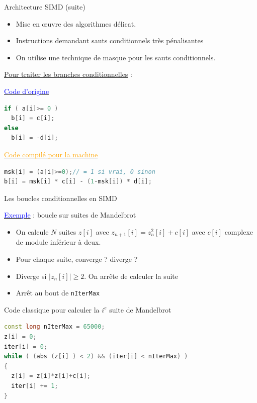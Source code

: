 \documentclass[handout]{beamer}
\begin{document}
\begin{frame}[fragile]{Architecture SIMD (suite)}

\begin{itemize}
\item Mise en {\oe}uvre des algorithmes délicat.
\item Instructions demandant sauts conditionnels très pénalisantes
\item On utilise une technique de masque pour les sauts conditionnels.
\end{itemize}

\underline{Pour traiter les branches conditionnelles} :

\begin{minipage}[t]{0.22\textwidth}
\underline{\textcolor{blue}{Code d'origine}}

 \begin{lstlisting}[language=C++]
if ( a[i]>= 0 )
  b[i] = c[i];
else
  b[i] = -d[i];
\end{lstlisting}
\end{minipage}
\hspace{1mm}
\begin{minipage}[t]{0.65\textwidth}
\underline{\textcolor{orange}{Code compilé pour la machine}}
\begin{lstlisting}[language=C++]
msk[i] = (a[i]>=0);// = 1 si vrai, 0 sinon
b[i] = msk[i] * c[i] - (1-msk[i]) * d[i];
\end{lstlisting}
\end{minipage}
\end{frame}

\begin{frame}[fragile]{Les boucles conditionnelles en SIMD}

\underline{\textcolor{blue}{Exemple}} : boucle sur suites de Mandelbrot 
\begin{itemize}
 \item On calcule $N$ suites $z[i]$ avec $z_{n+1}[i] = z^{2}_{n}[i] + c[i]$ avec $c[i]$ complexe de module inférieur à deux.
 \item Pour chaque suite, converge ? diverge ?
 \item Diverge si $\left|z_{n}[i]\right| \geq 2$. On arrête de calculer la suite
 \item Arrêt au bout de \texttt{nIterMax} 

\end{itemize}

\begin{block}{Code classique pour calculer la $i^{e}$ suite de Mandelbrot}

\begin{lstlisting}[language=C++]
const long nIterMax = 65000;
z[i] = 0;
iter[i] = 0;
while ( (abs (z[i] ) < 2) && (iter[i] < nIterMax) )
{
  z[i] = z[i]*z[i]+c[i];
  iter[i] += 1;
}
\end{lstlisting}
\end{block}
\end{frame}
\end{document}
